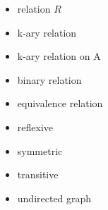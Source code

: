 \documentclass{article}
\begin{document}
\bigskip \indent
\begin{itemize}
\item relation $R$

\item k-ary relation

\item k-ary relation on A

\item binary relation

\item equivalence relation

\item reflexive

\item symmetric

\item transitive

\item undirected graph

\end{itemize}
\end{document}

